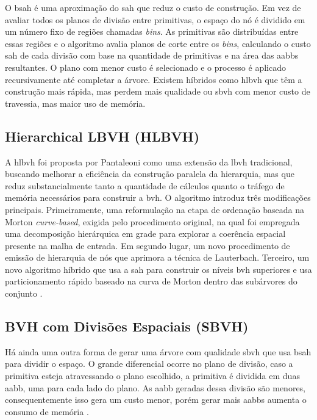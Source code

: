 O \gls{bsah} é uma aproximação do \gls{sah} que reduz o custo de construção. Em vez de avaliar todos os planos de divisão entre primitivas, o espaço do nó é dividido em um número fixo de regiões chamadas \textit{bins}. As primitivas são distribuídas entre essas regiões e o algoritmo avalia planos de corte entre os \textit{bins}, calculando o custo \gls{sah} de cada divisão com base na quantidade de primitivas e na área das \glspl{aabb} resultantes. O plano com menor custo é selecionado e o processo é aplicado recursivamente até completar a árvore. Existem híbridos como \gls{hlbvh} que têm a construção mais rápida, mas perdem mais qualidade \cite{garanzha2011grid} ou \gls{sbvh} com menor custo de travessia, mas maior uso de memória.


\subsection{Hierarchical LBVH (HLBVH)}

A \gls{hlbvh} foi proposta por Pantaleoni como uma extensão da \gls{lbvh} tradicional, buscando melhorar a eficiência da construção paralela da hierarquia, mas que reduz substancialmente tanto a quantidade de cálculos quanto o tráfego de memória necessários para construir a \gls{bvh}. O algoritmo introduz três modificações principais. Primeiramente, uma reformulação na etapa de ordenação baseada na Morton \textit{curve-based}, exigida pelo procedimento original, na qual foi empregada uma decomposição hierárquica em grade para explorar a coerência espacial presente na malha de entrada. Em segundo lugar, um novo procedimento de emissão de hierarquia de nós que aprimora a técnica de Lauterbach. Terceiro, um novo algoritmo híbrido que usa a \gls{sah} para construir os níveis \gls{bvh} superiores e usa particionamento rápido baseado na curva de Morton dentro das subárvores do conjunto \cite{pantaleoni2010hlbvh}.

\subsection{BVH com Divisões Espaciais (SBVH)}

Há ainda uma outra forma de gerar uma árvore com qualidade \gls{sbvh} que usa \gls{bsah} para dividir o espaço. O grande diferencial ocorre no plano de divisão, caso a primitiva esteja atravessando o plano escolhido, a primitiva é dividida em duas \gls{aabb}, uma para cada lado do plano. As \gls{aabb} geradas dessa divisão são menores, consequentemente isso gera um custo menor, porém gerar mais \glspl{aabb} aumenta o consumo de memória \cite{stibora2016building}.

